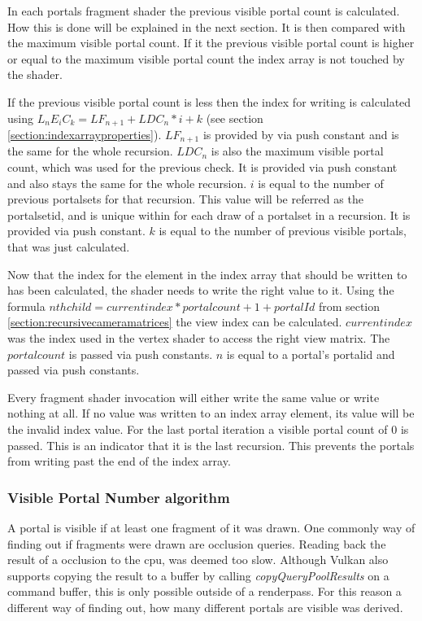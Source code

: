 In each portals fragment shader the previous visible portal count is calculated. How this is done will be explained in the next section. It is then compared with the maximum visible portal count. If it the previous visible portal count is higher or equal to the maximum visible portal count the index array is not touched by the shader.

If the previous visible portal count is less then the index for writing is calculated using $L_nE_iC_k = LF_{n+1} + LDC_{n} * i + k$ (see section \ref{section:indexarrayproperties}). $LF_{n+1}$ is provided by via push constant and is the same for the whole recursion.  $LDC_{n}$ is also the maximum visible portal count, which was used for the previous check. It is provided via push constant and also stays the same for the whole recursion. $i$ is equal to the number of previous \glspl{portalset} for that recursion. This value will be referred as the \gls{portalsetid}, and is unique within for each draw of a \gls{portalset} in a recursion. It is provided via push constant. $k$ is equal to the number of previous visible portals, that was just calculated.

Now that the index for the element in the index array that should be written to has been calculated, the shader needs to write the right value to it. Using the formula  $ nth child = current index * portalcount + 1 + portalId$ from section \ref{section:recursivecameramatrices} the view index can be calculated.  $currentindex$ was the index used in the vertex shader to access the right view matrix. The $portalcount$ is passed via push constants. $n$ is equal to a portal's \gls{portalid} and passed via push constants.

Every fragment shader invocation will either write the same value or write nothing at all. If no value was written to an index array element, its value will be the invalid index value. For the last portal iteration a visible portal count of 0 is passed. This is an indicator that it is the last recursion. This prevents the portals from writing past the end of the index array.

\subsubsection{Visible Portal Number algorithm}
\label{section:visibleportalcount}
A portal is visible if at least one fragment of it was drawn. One commonly way of finding out if fragments were drawn are occlusion queries. Reading back the result of a occlusion to the \gls{cpu}, was deemed too slow. Although Vulkan also supports copying the result to a buffer by calling \textit{copyQueryPoolResults} on a command buffer, this is only possible outside of a renderpass. For this reason a different way of finding out, how many different portals are visible was derived.

